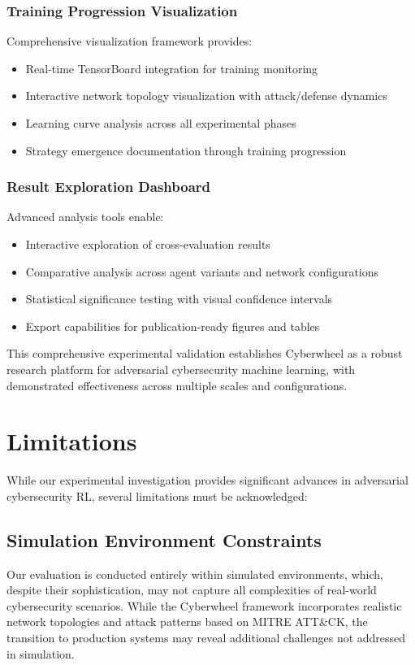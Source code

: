 \documentclass[11pt]{article}
\newcounter{phase}[algorithm]
\theoremstyle{definition}
\theoremstyle{plain}
\begin{document}
\subsubsection{Training Progression Visualization}
Comprehensive visualization framework provides:
\begin{itemize}
\item Real-time TensorBoard integration for training monitoring
\item Interactive network topology visualization with attack/defense dynamics
\item Learning curve analysis across all experimental phases
\item Strategy emergence documentation through training progression
\end{itemize}

\subsubsection{Result Exploration Dashboard}
Advanced analysis tools enable:
\begin{itemize}
\item Interactive exploration of cross-evaluation results
\item Comparative analysis across agent variants and network configurations
\item Statistical significance testing with visual confidence intervals
\item Export capabilities for publication-ready figures and tables
\end{itemize}

This comprehensive experimental validation establishes Cyberwheel as a robust research platform for adversarial cybersecurity machine learning, with demonstrated effectiveness across multiple scales and configurations.

\section{Limitations}

While our experimental investigation provides significant advances in adversarial cybersecurity RL, several limitations must be acknowledged:

\subsection{Simulation Environment Constraints}

Our evaluation is conducted entirely within simulated environments, which, despite their sophistication, may not capture all complexities of real-world cybersecurity scenarios. While the Cyberwheel framework incorporates realistic network topologies and attack patterns based on MITRE ATT\&CK, the transition to production systems may reveal additional challenges not addressed in simulation.
\end{document}
